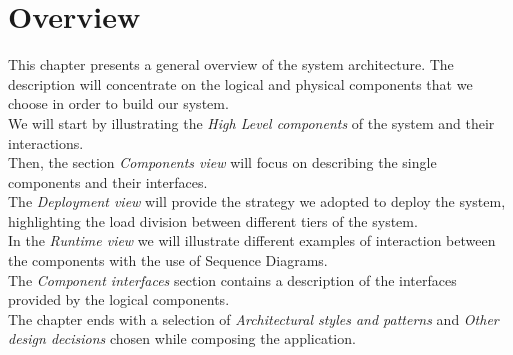 \section{Overview}
This chapter presents a general overview of the system architecture.
The description will concentrate on the logical and physical components that
we choose in order to build our system. \\
We will start by illustrating the \textit{High Level components} of the system and their interactions. \\
Then, the section \textit{Components view} will focus on describing the single components and their interfaces. \\
The \textit{Deployment view} will provide the strategy we adopted to deploy the system, highlighting the load division between different tiers of the system. \\
In the \textit{Runtime view} we will illustrate different examples of interaction between the components with the use of Sequence Diagrams. \\
The \textit{Component interfaces} section contains a description of the interfaces provided by the logical components. \\
The chapter ends with a selection of \textit{Architectural styles and patterns} and \textit{Other design decisions} chosen while composing the application.
\clearpage

